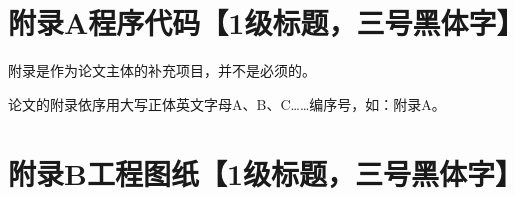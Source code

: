 \begin{appendix}

\section*{附录A\hspace{1em}程序代码【1级标题，三号黑体字】}
附录是作为论文主体的补充项目，并不是必须的。\par
论文的附录依序用大写正体英文字母A、B、C……编序号，如：附录A。

\section*{附录B\hspace{1em}工程图纸【1级标题，三号黑体字】}

\end{appendix}